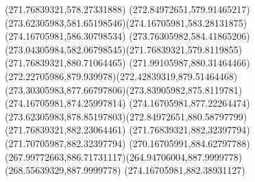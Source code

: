 {{		\lineto(271.76839321,578.27331888)
		\curveto(272.84972651,579.91465217)(273.62305983,581.65198546)(274.16705981,583.28131875)
		\closepath
		\moveto(274.16705981,586.30798534)
		\curveto(273.76305982,584.41865206)(273.04305984,582.06798545)(271.76839321,579.8119855)
		\lineto(271.76839321,880.71064465)
		\curveto(271.99105987,880.31464466)(272.22705986,879.939978)(272.42839319,879.51464468)
		\curveto(273.30305983,877.66797806)(273.83905982,875.8119781)(274.16705981,874.25997814)
		\closepath
		\moveto(274.16705981,877.22264474)
		\curveto(273.62305983,878.85197803)(272.84972651,880.58797799)(271.76839321,882.23064461)
		\lineto(271.76839321,882.32397794)
		\lineto(271.70705987,882.32397794)
		\curveto(270.16705991,884.62797788)(267.99772663,886.71731117)(264.94706004,887.9999778)
		\lineto(268.55639329,887.9999778)
		\lineto(274.16705981,882.38931127)
		\closepath
	}
}
